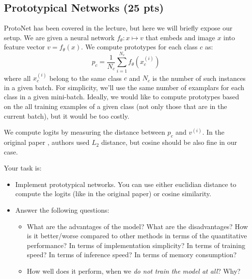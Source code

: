\documentclass[letterpaper,12pt]{article}
\begin{document}
\subsection{Prototypical Networks (25 pts)}
ProtoNet has been covered in the lecture, but here we will briefly expose our setup.
We are given a neural network $f_\theta : x \mapsto v$ that embeds and image $x$ into feature vector $v = f_\theta(x)$.
We compute prototypes for each class $c$ as:
\begin{equation}
    p_c = \frac{1}{N_c} \sum_{i=1}^{N_c} f_\theta(x^{(i)}_c)
\end{equation}
where all $x^{(i)}_c$ belong to the same class $c$ and $N_c$ is the number of such instances in a given batch.
For simplicity, we'll use the same number of examplars for each class in a given mini-batch.
Ideally, we would like to compute prototypes based on the all training examples of a given class (not only those that are in the current batch), but it would be too costly.

We compute logits by measuring the distance between $p_c$ and $v^{(i)}$.
In the original paper \cite{ProtoNet}, authors used $L_2$ distance, but cosine should be also fine in our case.

Your task is:
\begin{itemize}
    \item Implement prototypical networks. You can use either euclidian distance to compute the logits (like in the original paper) or cosine similarity.
    \item Answer the following questions:
    \begin{itemize}
        \item What are the advantages of the model? What are the disadvantages? How is it better/worse compared to other methods in terms of the quantitative performance? In terms of implementation simplicity? In terms of training speed? In terms of inference speed? In terms of memory consumption?
        \item How well does it perform, when we \textit{do not train the model at all}? Why?
    \end{itemize}
\end{itemize}
\end{document}
